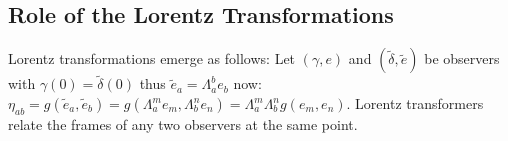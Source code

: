 \documentclass[10pt, oneside]{article}
\begin{document}
\subsection{Role of the Lorentz Transformations}
Lorentz transformations emerge as follows: Let $(\gamma,e)$ and $(\tilde{\delta},\tilde{e})$ be observers with $\gamma(0)=\tilde{\delta}(0)$ thus $\tilde{e}_a =\Lambda^b_a e_b$ now: $\eta_{ab}= g(\tilde{e}_a,\tilde{e}_b)=g(\Lambda^m_a e_m,\Lambda^n_b e_n)= \Lambda^m_a \Lambda^n_b g(e_m,e_n)$. Lorentz transformers relate the frames of any two observers at the same point.



\end{document}
